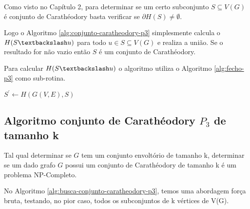 Como visto no Capítulo 2, para determinar se um certo 
subconjunto $S \subseteq V(G)$ é conjunto de Carathéodory 
basta verificar se $\partial H(S) \ne \emptyset$.

Logo o Algoritmo \ref{alg:conjunto-caratheodory-p3} simplesmente
calcula o $H(S\textbackslash u)$ para todo $u \in S \subseteq V(G)$ 
e realiza a união. Se o resultado for não vazio então $S$ é um conjunto de Carathéodory.

Para calcular $H(S\textbackslash u)$ o algoritmo utiliza o Algoritmo \ref{alg:fecho-p3} como sub-rotina.

\begin{algorithm2e}
    \SetAlFnt{\tiny}
    \SetAlCapFnt{\small}
    \SetAlCapNameFnt{\small}
    \SetAlgoLined
    \DontPrintSemicolon
    \LinesNumbered
    \SetAlgoLined
    \BlankLine
    \BlankLine
    $S^\prime \gets H(G(V,E),S)$ \\
\caption{$ConjuntoCaratheodory(G(V,E),S)$}
\label{alg:conjunto-caratheodory-p3}
\end{algorithm2e}


\subsection{Algoritmo conjunto de Carathéodory $P_3$ de tamanho k}
Tal qual determinar se $G$ tem um conjunto envoltório de tamanho k, 
determinar se um dado grafo $G$ possui um conjunto de Carathéodory de tamanho k é um problema NP-Completo.

No Algoritmo \ref{alg:busca-conjunto-caratheodory-p3},
temos uma abordagem força bruta, testando, no pior caso,
todos os subconjuntos de k vértices de V(G).

